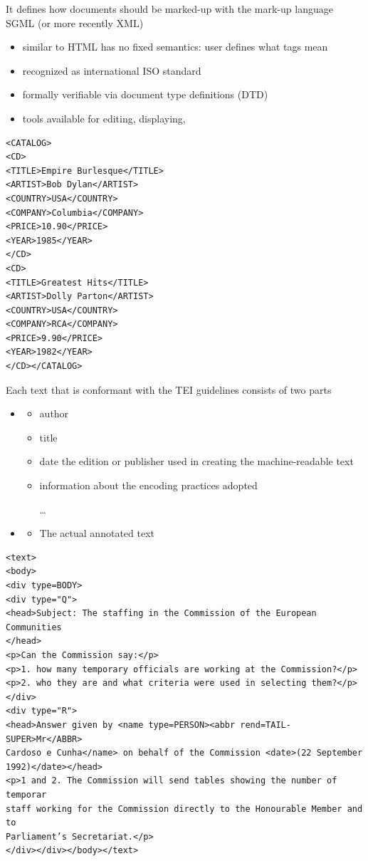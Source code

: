 \documentclass[a4paper,landscape,headrule,footrule,xetex]{foils}
\begin{document}
It defines how documents should be marked-up
with the mark-up language SGML (or more
recently XML)




\begin{itemize}
\item {} similar to HTML
has no fixed semantics: user defines what tags
mean
\item recognized as international ISO standard
\item formally verifiable via document type definitions
(DTD)
\item tools available for editing, displaying,
\end{itemize}
\begin{small}
\begin{verbatim}
<CATALOG>
<CD>
<TITLE>Empire Burlesque</TITLE>
<ARTIST>Bob Dylan</ARTIST>
<COUNTRY>USA</COUNTRY>
<COMPANY>Columbia</COMPANY>
<PRICE>10.90</PRICE>
<YEAR>1985</YEAR>
</CD>
<CD>
<TITLE>Greatest Hits</TITLE>
<ARTIST>Dolly Parton</ARTIST>
<COUNTRY>USA</COUNTRY>
<COMPANY>RCA</COMPANY>
<PRICE>9.90</PRICE>
<YEAR>1982</YEAR>
</CD></CATALOG>
\end{verbatim}
\end{small}

Each text that is conformant with the TEI guidelines
consists of two parts
\begin{itemize}
\item {}
  \begin{itemize}
  \item author
  \item title
  \item date the edition or publisher used in creating the machine-readable text
  \item information about the encoding practices adopted
   \item[\ldots]
   \end{itemize}
 \item {}
   \begin{itemize}
   \item The actual annotated text
   \end{itemize}
 \end{itemize}
   

\begin{verbatim}
<text>
<body>
<div type=BODY>
<div type="Q">
<head>Subject: The staffing in the Commission of the European Communities
</head>
<p>Can the Commission say:</p>
<p>1. how many temporary officials are working at the Commission?</p>
<p>2. who they are and what criteria were used in selecting them?</p>
</div>
<div type="R">
<head>Answer given by <name type=PERSON><abbr rend=TAIL-SUPER>Mr</ABBR>
Cardoso e Cunha</name> on behalf of the Commission <date>(22 September
1992)</date></head>
<p>1 and 2. The Commission will send tables showing the number of temporar
staff working for the Commission directly to the Honourable Member and to
Parliament’s Secretariat.</p>
</div></div></body></text>
\end{verbatim}
\end{document}

